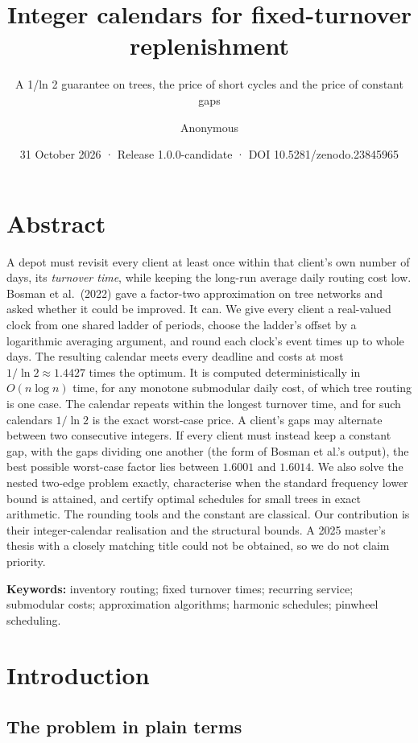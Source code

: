 \documentclass[
  british,
  11pt,
  a4paper,
]{article}
\title{Integer calendars for fixed-turnover replenishment}
\subtitle{A 1/ln 2 guarantee on trees, the price of short cycles and the
price of constant gaps}
\author{Anonymous}
\date{31 October 2026 · Release 1.0.0-candidate · DOI
10.5281/zenodo.23845965}
\begin{document}
\maketitle

{
\setcounter{tocdepth}{2}
\tableofcontents
}
\section*{Abstract}\label{abstract}

A depot must revisit every client at least once within that client's own
number of days, its \emph{turnover time}, while keeping the long-run
average daily routing cost low. Bosman et al.~(2022) gave a factor-two
approximation on tree networks and asked whether it could be improved.
It can. We give every client a real-valued clock from one shared ladder
of periods, choose the ladder's offset by a logarithmic averaging
argument, and round each clock's event times up to whole days. The
resulting calendar meets every deadline and costs at most
\(1/\ln2\approx1.4427\) times the optimum. It is computed
deterministically in \(O(n\log n)\) time, for any monotone submodular
daily cost, of which tree routing is one case. The calendar repeats
within the longest turnover time, and for such calendars \(1/\ln2\) is
the exact worst-case price. A client's gaps may alternate between two
consecutive integers. If every client must instead keep a constant gap,
with the gaps dividing one another (the form of Bosman et al.'s output),
the best possible worst-case factor lies between \(1.6001\) and
\(1.6014\). We also solve the nested two-edge problem exactly,
characterise when the standard frequency lower bound is attained, and
certify optimal schedules for small trees in exact arithmetic. The
rounding tools and the constant are classical. Our contribution is their
integer-calendar realisation and the structural bounds. A 2025 master's
thesis with a closely matching title could not be obtained, so we do not
claim priority.

\textbf{Keywords:} inventory routing; fixed turnover times; recurring
service; submodular costs; approximation algorithms; harmonic schedules;
pinwheel scheduling.

\section{Introduction}\label{introduction}

\subsection{The problem in plain
terms}\label{the-problem-in-plain-terms}
\end{document}
